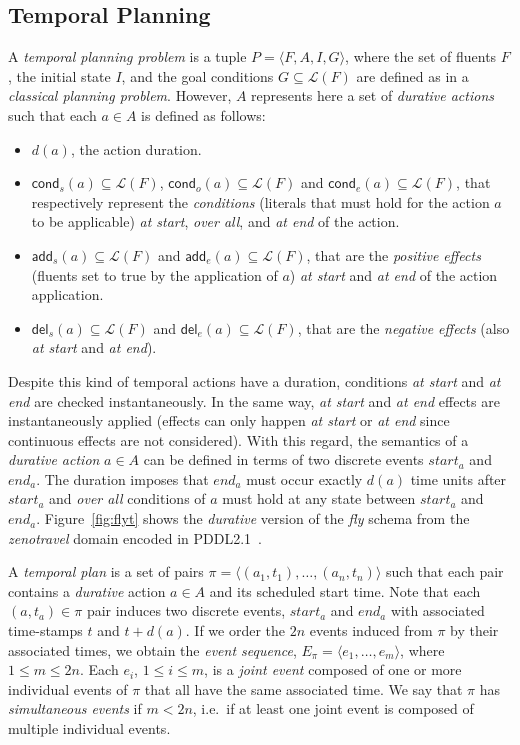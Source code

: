\documentclass[letterpaper]{article} %
\newcommand{\tup}[1]{{\langle #1 \rangle}}
\newcommand{\del}{\mathsf{del}}     %
\newcommand{\add}{\mathsf{add}}     %
\newcommand{\cond}{\mathsf{cond}}   %
\begin{document}
\subsection{Temporal Planning}
A {\em temporal planning problem} is a tuple $P=\tup{F,A,I,G}$, where the set of fluents $F$, the initial state $I$, and the goal conditions $G\subseteq\mathcal{L}(F)$ are defined as in a {\em classical planning problem}. However, $A$ represents here a set of {\em durative actions} such that each $a\in A$ is defined as follows:
\begin{itemize}
\item $d(a)$, the action duration.
\item $\cond_s(a)\subseteq\mathcal{L}(F)$, $\cond_o(a)\subseteq\mathcal{L}(F)$ and $\cond_e(a)\subseteq\mathcal{L}(F)$, that respectively represent the {\em conditions} (literals that must hold for the action $a$ to be applicable) {\em at start}, {\em over all}, and {\em at end} of the action.

\item $\add_s(a)\subseteq\mathcal{L}(F)$ and $\add_e(a)\subseteq\mathcal{L}(F)$, that are the {\em positive effects} (fluents set to true by the application of $a$) {\em at start} and {\em at end} of the action application.
\item  $\del_s(a)\subseteq\mathcal{L}(F)$ and $\del_e(a)\subseteq\mathcal{L}(F)$, that are the {\em negative effects} (also {\em at start} and {\em at end}).
\end{itemize}
Despite this kind of temporal actions have a duration, conditions {\em at start} and {\em at end} are checked instantaneously. In the same way, {\em at start} and {\em at end} effects are instantaneously applied (effects can only happen {\em at start} or {\em at end} since continuous effects are not considered). With this regard, the semantics of a {\em durative action} $a\in A$ can be defined in terms of two discrete events $start_a$ and $end_a$. The duration imposes that $end_a$ must occur exactly $d(a)$ time units after $start_a$ and {\em over all} conditions of $a$ must hold at any state between $start_a$ and $end_a$. Figure~\ref{fig:flyt} shows the {\em durative} version of the {\em fly} schema from the {\em zenotravel} domain encoded in PDDL2.1~\cite{fox2003pddl2}.

A {\em temporal plan} is a set of pairs $\pi=\tup{(a_1,t_1), \ldots, (a_n,t_n)}$ such that each pair contains a {\em durative} action $a\in A$ and its scheduled start time. Note that each $(a,t_a)\in \pi$ pair induces two discrete events, $start_a$ and $end_a$ with associated time-stamps $t$ and $t+d(a)$. If we order the $2n$ events induced from $\pi$ by their associated times, we obtain the {\em event sequence}, $E_{\pi}=\langle e_1,\ldots,e_m\rangle$, where {\small $1\leq m\leq 2n$}. Each $e_i$, {\small $1\leq i\leq m$}, is a {\em joint event} composed of one or more individual events of $\pi$ that all have the same associated time. We say that $\pi$ has {\em simultaneous events} if $m<2n$, i.e.~if at least one joint event is composed of multiple individual events. 
\end{document}
